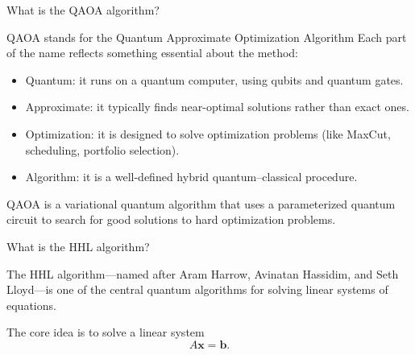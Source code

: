 \documentclass{beamer}
\begin{document}
\begin{frame}{What is the QAOA algorithm?}
\begin{block}{QAOA stands for the Quantum Approximate Optimization Algorithm}
Each part of the name reflects something essential about the method:
\begin{itemize}
\item Quantum: it runs on a quantum computer, using qubits and quantum gates.
\item Approximate: it typically finds near-optimal solutions rather than exact ones.
\item Optimization: it is designed to solve optimization problems (like MaxCut, scheduling, portfolio selection).
\item Algorithm: it is a well-defined hybrid quantum–classical procedure.
\end{itemize}
\end{block}

QAOA is a variational quantum algorithm that uses a parameterized quantum circuit to search for good solutions to hard optimization problems.
\end{frame}

\begin{frame}{What is the HHL algorithm?}

The HHL algorithm—named after Aram Harrow, Avinatan Hassidim, and Seth
Lloyd—is one of the central quantum algorithms for solving linear
systems of equations.

The core idea is to solve a linear system
\[
A \mathbf{x} = \mathbf{b}.
\]
\end{frame}
\end{document}
